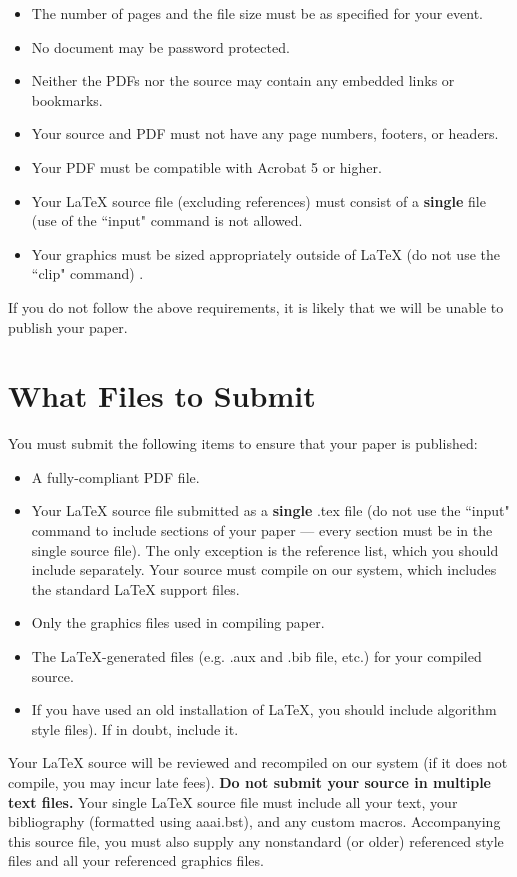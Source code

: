 \documentclass[letterpaper]{article} %
\begin{document}
\begin{itemize}
\item The number of pages and the file size must be as specified for your event.
\item No document may be password protected.
\item Neither the PDFs nor the source may contain any embedded links or bookmarks.
\item Your source and PDF must not have any page numbers, footers, or headers.
\item Your PDF must be compatible with Acrobat 5 or higher.
\item Your \LaTeX{} source file (excluding references) must consist of a \textbf{single} file (use of the ``input" command is not allowed.
\item Your graphics must be sized appropriately outside of \LaTeX{} (do not use the ``clip" command) .
\end{itemize}

If you do not follow the above requirements, it is likely that we will be unable to publish your paper.

\section{What Files to Submit}
You must submit the following items to ensure that your paper is published:
\begin{itemize}
\item A fully-compliant PDF file.
\item Your  \LaTeX{}  source file submitted as a \textbf{single} .tex file (do not use the ``input" command to include sections of your paper --- every section must be in the single source file). The only exception is the reference list, which you should include separately. Your source must compile on our system, which includes the standard \LaTeX{} support files.
\item Only the graphics files used in compiling paper.
\item The \LaTeX{}-generated files (e.g. .aux and .bib file, etc.) for your compiled source.
\item If you have used an old installation of \LaTeX{}, you should include algorithm style files). If in doubt, include it.
\end{itemize}

Your \LaTeX{} source will be reviewed and recompiled on our system (if it does not compile, you may incur late fees).   \textbf{Do not submit your source in multiple text files.} Your single \LaTeX{} source file must include all your text, your bibliography (formatted using aaai.bst), and any custom macros. Accompanying this source file, you must also supply any nonstandard (or older) referenced style files and all your referenced graphics files.
\end{document}
